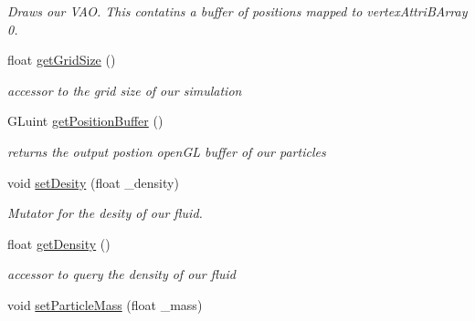 \begin{DoxyCompactItemize}
\begin{DoxyCompactList}\small\item\em Draws our V\-A\-O. This contatins a buffer of positions mapped to vertex\-Attri\-B\-Array 0. \end{DoxyCompactList}\item 
\hypertarget{class_s_p_h_engine_ab5811f68d71d923ac3a8e24d2d220d7b}{float \hyperlink{class_s_p_h_engine_ab5811f68d71d923ac3a8e24d2d220d7b}{get\-Grid\-Size} ()}\label{class_s_p_h_engine_ab5811f68d71d923ac3a8e24d2d220d7b}

\begin{DoxyCompactList}\small\item\em accessor to the grid size of our simulation \end{DoxyCompactList}\item 
\hypertarget{class_s_p_h_engine_aee51f7802e02c838732d9acab37da89a}{G\-Luint \hyperlink{class_s_p_h_engine_aee51f7802e02c838732d9acab37da89a}{get\-Position\-Buffer} ()}\label{class_s_p_h_engine_aee51f7802e02c838732d9acab37da89a}

\begin{DoxyCompactList}\small\item\em returns the output postion open\-G\-L buffer of our particles \end{DoxyCompactList}\item 
\hypertarget{class_s_p_h_engine_acbc638f7ab8fa2ab356dadf677df10c6}{void \hyperlink{class_s_p_h_engine_acbc638f7ab8fa2ab356dadf677df10c6}{set\-Desity} (float \-\_\-density)}\label{class_s_p_h_engine_acbc638f7ab8fa2ab356dadf677df10c6}

\begin{DoxyCompactList}\small\item\em Mutator for the desity of our fluid. \end{DoxyCompactList}\item 
\hypertarget{class_s_p_h_engine_a8ee29d26f9451d81a07abde5b1aa53c6}{float \hyperlink{class_s_p_h_engine_a8ee29d26f9451d81a07abde5b1aa53c6}{get\-Density} ()}\label{class_s_p_h_engine_a8ee29d26f9451d81a07abde5b1aa53c6}

\begin{DoxyCompactList}\small\item\em accessor to query the density of our fluid \end{DoxyCompactList}\item 
\hypertarget{class_s_p_h_engine_a0f937d1c09511f302455f102fae167c3}{void \hyperlink{class_s_p_h_engine_a0f937d1c09511f302455f102fae167c3}{set\-Particle\-Mass} (float \-\_\-mass)}\label{class_s_p_h_engine_a0f937d1c09511f302455f102fae167c3}


\end{DoxyCompactItemize}
